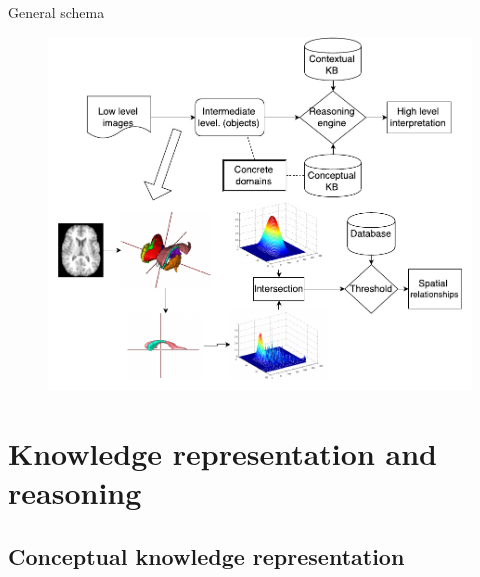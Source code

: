 \documentclass{beamer}
\begin{document}
\begin{frame}{General schema}
	\begin{figure}[t]
	\includegraphics[width=\linewidth,height=0.9\textheight]{images/flowchart_3_crop.pdf}
	\end{figure}
 	\vspace{5cm}
\end{frame}
\section{Knowledge representation and reasoning}
\subsection{Conceptual knowledge representation}
% 
\end{document}

